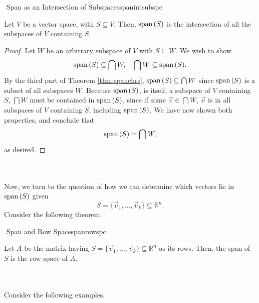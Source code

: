         \begin{theorem}{\Stop\,\,Span as an Intersection of Subspaces}{spanintsubspc}
            
            Let \(V\) be a vector space, with \(S\subseteq V\). Then, \(\text{span\,}(S)\) is the intersection of all the subspaces of \(V\) containing \(S\).
            \begin{proof}
                Let \(W\) be an arbitrary subspace of \(V\) with \(S\subseteq W\). We wish to show
                \begin{equation*}
                    \text{span\,}(S)\subseteq\bigcap W,\quad \bigcap W\subseteq\text{span\,}(S).
                \end{equation*}
                By the third part of Theorem \ref{thm:spanchrs}, \(\text{span\,}(S)\subseteq \bigcap W\) since \(\text{span\,}(S)\) is a subset of all subspaces \(W\). Because \(\text{span\,}(S)\), is itself, a subspace of \(V\) containing \(S\), \(\bigcap W\) must be contained in \(\text{span\,}(S)\), since if some \(\vec{v}\in \bigcap W\), \(\vec{v}\) is in all subspaces of \(V\) containing \(S\), including \(\text{span\,}(S)\). We have now shown both properties, and conclude that
                \begin{equation*}
                    \text{span\,}(S)=\bigcap W,
                \end{equation*}
                as desired.
            \end{proof}
        \end{theorem}
        \pagebreak
        \vphantom
        \\
        \\
        Now, we turn to the question of how we can determine which vectors lie in \(\text{span\,}(S)\) given
        \begin{equation*}
            S=\{\vec{v}_1,\ldots,\vec{v}_k\}\subseteq\mathbb{R}^n.
        \end{equation*}
        Consider the following theorem.
        \begin{theorem}{\Stop\,\,Span and Row Space}{spanrowspc}

            Let \(A\) be the matrix having \(S=\{\vec{v}_1,\ldots,\vec{v}_k\}\subseteq\mathbb{R}^n\) as its rows. Then, the span of \(S\) is the row space of \(A\).
            
        \end{theorem}
        \vphantom
        \\
        \\
        Consider the following examples.
